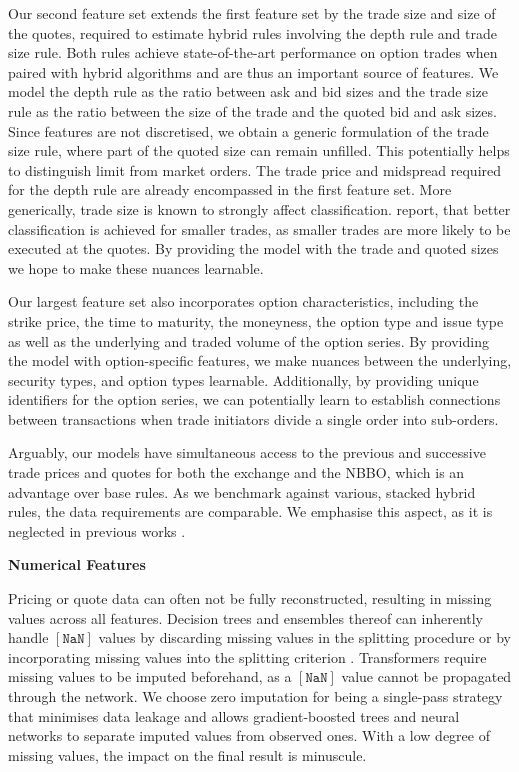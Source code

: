 Our second feature set extends the first feature set by the trade size and size of the quotes, required to estimate hybrid rules involving the depth rule and trade size rule. Both rules achieve state-of-the-art performance on option trades when paired with hybrid algorithms and are thus an important source of features. We model the depth rule as the ratio between ask and bid sizes and the trade size rule as the ratio between the size of the trade and the quoted bid and ask sizes. Since features are not discretised, we obtain a generic formulation of the trade size rule, where part of the quoted size can remain unfilled. This potentially helps to distinguish limit from market orders. The trade price and midspread required for the depth rule are already encompassed in the first feature set. More generically, trade size is known to strongly affect classification. \textcites[][889]{savickasInferringDirectionOption2003}[][537]{ellisAccuracyTradeClassification2000} report, that better classification is achieved for smaller trades, as smaller trades are more likely to be executed at the quotes. By providing the model with the trade and quoted sizes we hope to make these nuances learnable.

Our largest feature set also incorporates option characteristics, including the strike price, the time to maturity, the moneyness, the option type and issue type as well as the underlying and traded volume of the option series. By providing the model with option-specific features, we make nuances between the underlying, security types, and option types learnable. Additionally, by providing unique identifiers for the option series, we can potentially learn to establish connections between transactions when trade initiators divide a single order into sub-orders.

Arguably, our models have simultaneous access to the previous and successive trade prices and quotes for both the exchange and the NBBO, which is an advantage over base rules. As we benchmark against various, stacked hybrid rules, the data requirements are comparable. We emphasise this aspect, as it is neglected in previous works \autocites[][485]{blazejewskiLocalNonParametricModel2005}[][48]{ronenMachineLearningTrade2022}[][9]{rosenthalModelingTradeDirection2012}.

\textbf{Numerical Features}

Pricing or quote data can often not be fully reconstructed, resulting in missing values across all features. Decision trees and ensembles thereof can inherently handle $\mathtt{[NaN]}$ values by discarding missing values in the splitting procedure \autocite[][150--152]{breimanClassificationRegressionTrees2017} or by incorporating missing values into the splitting criterion \autocite[][951]{twalaGoodMethodsCoping2008}. Transformers require missing values to be imputed beforehand, as a $\mathtt{[NaN]}$ value cannot be propagated through the network. We choose zero imputation for being a single-pass strategy that minimises data leakage and allows gradient-boosted trees and neural networks to separate imputed values from observed ones. With a low degree of missing values, the impact on the final result is minuscule.

